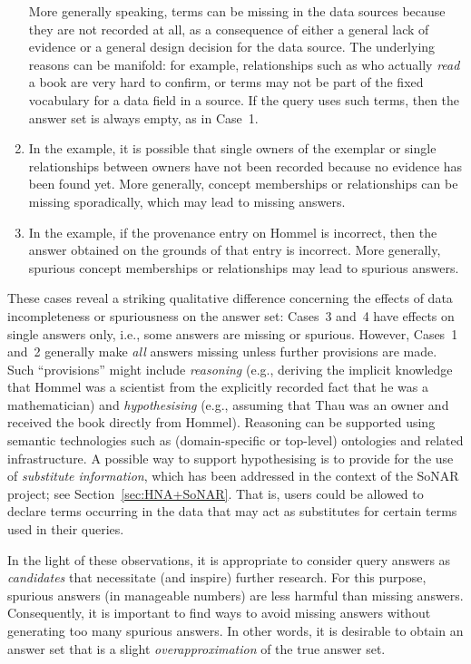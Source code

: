 \begin{enumerate}
    More generally speaking, terms can be missing in the data sources
    because they are not recorded at all, as a consequence of either a general lack of evidence
    or a general design decision for the data source. The underlying reasons can be manifold:
    for example, relationships such as who actually \emph{read} a book are very hard to confirm,
    or terms may not be part of the fixed vocabulary for a data field in a source.
    If the query uses such terms, then the answer set is always empty, as in Case~1.
  \item    
    In the example, it is possible that single owners of the exemplar or single relationships between owners
    have not been recorded because no evidence has been found yet.
    More generally, concept memberships or relationships can be missing sporadically,
    which may lead to missing answers.
  \item
    In the example, if the provenance entry on Hommel is incorrect, then the answer obtained on the grounds
    of that entry is incorrect.
    More generally, spurious concept memberships or relationships may lead to spurious answers.
\end{enumerate}
%
These cases reveal a striking qualitative difference concerning the effects of data incompleteness or spuriousness
on the answer set: Cases~3 and~4 have effects on single answers only, i.e., some answers are missing or spurious.
However, Cases~1 and~2 generally make \emph{all} answers missing unless further provisions are made.
Such \enquote{provisions} might include \emph{reasoning}
(e.g., deriving the implicit knowledge that Hommel was a scientist from the explicitly recorded fact that he was a mathematician)
and \emph{hypothesising} (e.g., assuming that Thau was an owner and received the book directly from Hommel).
Reasoning can be supported using semantic technologies such as (domain-specific or top-level) ontologies and related infrastructure.
A possible way to support hypothesising is to provide for the use of \emph{substitute information},
which has been addressed in the context of the SoNAR project; see Section~\ref{sec:HNA+SoNAR}.
That is, users could be allowed to declare terms occurring in the data that may act as substitutes for certain terms used in their queries.

In the light of these observations,
it is appropriate to consider
query answers as \emph{candidates} that necessitate (and inspire) further research.
For this purpose, spurious answers (in manageable numbers) are less harmful than missing answers.
Consequently, it is important to find ways to avoid missing answers without generating too many spurious answers.
In other words, it is desirable to obtain an answer set that is a slight \emph{overapproximation}
of the true answer set.

